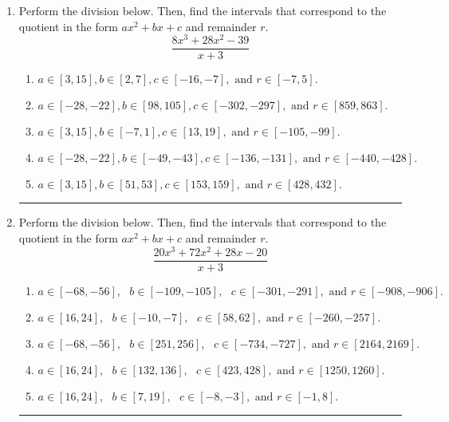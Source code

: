 \documentclass[14pt]{extbook}
\newcommand{\litem}[1]{\item#1\hspace*{-1cm}\rule{\textwidth}{0.4pt}}
\begin{document}
\begin{enumerate}
{\begin{enumerate}[label=\Alph*.]
\end{enumerate} }
\litem{
Perform the division below. Then, find the intervals that correspond to the quotient in the form $ax^2+bx+c$ and remainder $r$.\[ \frac{8x^{3} +28 x^{2} -39}{x + 3} \]\begin{enumerate}[label=\Alph*.]
\item \( a \in [3, 15], b \in [2, 7], c \in [-16, -7], \text{ and } r \in [-7, 5]. \)
\item \( a \in [-28, -22], b \in [98, 105], c \in [-302, -297], \text{ and } r \in [859, 863]. \)
\item \( a \in [3, 15], b \in [-7, 1], c \in [13, 19], \text{ and } r \in [-105, -99]. \)
\item \( a \in [-28, -22], b \in [-49, -43], c \in [-136, -131], \text{ and } r \in [-440, -428]. \)
\item \( a \in [3, 15], b \in [51, 53], c \in [153, 159], \text{ and } r \in [428, 432]. \)

\end{enumerate} }
\litem{
Perform the division below. Then, find the intervals that correspond to the quotient in the form $ax^2+bx+c$ and remainder $r$.\[ \frac{20x^{3} +72 x^{2} +28 x -20}{x + 3} \]\begin{enumerate}[label=\Alph*.]
\item \( a \in [-68, -56], \text{   } b \in [-109, -105], \text{   } c \in [-301, -291], \text{   and   } r \in [-908, -906]. \)
\item \( a \in [16, 24], \text{   } b \in [-10, -7], \text{   } c \in [58, 62], \text{   and   } r \in [-260, -257]. \)
\item \( a \in [-68, -56], \text{   } b \in [251, 256], \text{   } c \in [-734, -727], \text{   and   } r \in [2164, 2169]. \)
\item \( a \in [16, 24], \text{   } b \in [132, 136], \text{   } c \in [423, 428], \text{   and   } r \in [1250, 1260]. \)
\item \( a \in [16, 24], \text{   } b \in [7, 19], \text{   } c \in [-8, -3], \text{   and   } r \in [-1, 8]. \)


\end{enumerate}}
\end{enumerate}
\end{document}
